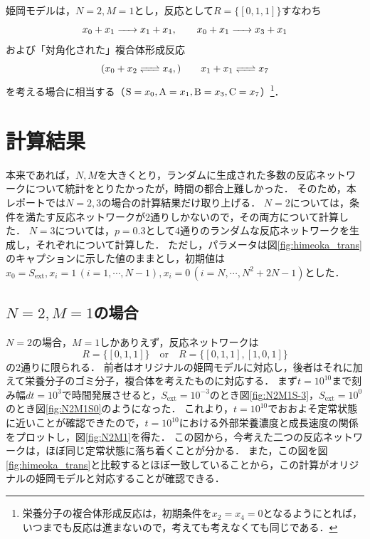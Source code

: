\documentclass[a4paper,11pt]{jsarticle}
\begin{document}
姫岡モデルは，$N=2,M=1$とし，反応として$R=\{[0,1,1]\}$すなわち
\begin{equation}
  x_0 + x_1 \ce{->} x_1 + x_1 ,\qquad x_0 + x_1 \ce{->} x_{3} + x_1
\end{equation}
および「対角化された」複合体形成反応
\begin{equation}
  (x_0 + x_2 \ce{<=>} x_{4},)\qquad x_1 + x_1 \ce{<=>} x_7 
\end{equation}
を考える場合に相当する（$\ce{S}=x_0, \ce{A}=x_1, \ce{B}=x_3, \ce{C}=x_7$）\footnote{栄養分子の複合体形成反応は，初期条件を$x_2=x_4=0$となるようにとれば，いつまでも反応は進まないので，考えても考えなくても同じである．}．

\section{計算結果}
本来であれば，$N,M$を大きくとり，ランダムに生成された多数の反応ネットワークについて統計をとりたかったが，時間の都合上難しかった．
そのため，本レポートでは$N=2,3$の場合の計算結果だけ取り上げる．
$N=2$については，条件を満たす反応ネットワークが2通りしかないので，その両方について計算した．
$N=3$については，$p=0.3$として4通りのランダムな反応ネットワークを生成し，それぞれについて計算した．
ただし，パラメータは図\ref{fig:himeoka_trans}のキャプションに示した値のままとし，初期値は$x_0=S_{\mathrm{ext}},x_i=1\,(i=1,\cdots,N-1),x_i=0\,(i=N,\cdots,N^2+2N-1)$とした．

\subsection{$N=2,M=1$の場合}
$N=2$の場合，$M=1$しかありえず，反応ネットワークは
\begin{equation}
  R = \{[0,1,1]\} \quad\mathrm{or}\quad R = \{[0,1,1],[1,0,1]\}
\end{equation}
の2通りに限られる．
前者はオリジナルの姫岡モデルに対応し，後者はそれに加えて栄養分子のゴミ分子，複合体を考えたものに対応する．
まず$t=10^{10}$まで刻み幅$dt=10^3$で時間発展させると，$S_{\mathrm{ext}}=10^{-3}$のとき図\ref{fig:N2M1S-3}，$S_{\mathrm{ext}}=10^0$のとき図\ref{fig:N2M1S0}のようになった．
これより，$t=10^{10}$でおおよそ定常状態に近いことが確認できたので，$t=10^{10}$における外部栄養濃度と成長速度の関係をプロットし，図\ref{fig:N2M1}を得た．
この図から，今考えた二つの反応ネットワークは，ほぼ同じ定常状態に落ち着くことが分かる．
また，この図を図\ref{fig:himeoka_trans}と比較するとほぼ一致していることから，この計算がオリジナルの姫岡モデルと対応することが確認できる．
\end{document}
